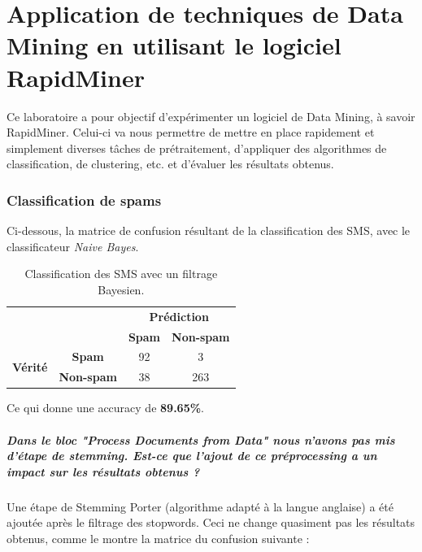 \documentclass[a4paper]{article}
\begin{document}
\part*{Application de techniques de Data Mining en utilisant le logiciel RapidMiner}
Ce laboratoire a pour objectif d'expérimenter un logiciel de Data Mining, à savoir RapidMiner.
Celui-ci va nous permettre de mettre en place rapidement et simplement diverses tâches de prétraitement, d'appliquer des algorithmes de classification, de clustering, etc. et d'évaluer les résultats obtenus.

\section{Classification de spams}
Ci-dessous, la matrice de confusion résultant de la classification des SMS, avec le classificateur \textit{Naive Bayes}.

\begin{table}[H]
	\centering
	\def\arraystretch{2.0}
	\begin{tabular}{cccl}
		                                                      & \textbf{}                              & \multicolumn{2}{c}{\textbf{Prédiction}}                                          \\ \cline{3-4} 
		    												  & \multicolumn{1}{c|}{}                  & \multicolumn{1}{c|}{\textbf{Spam}}      & \multicolumn{1}{c|}{\textbf{Non-spam}} \\ \cline{2-4} 
		\multicolumn{1}{c|}{\multirow{2}{*}{\textbf{Vérité}}} & \multicolumn{1}{c|}{\textbf{Spam}}     & \multicolumn{1}{c|}{92}                 & \multicolumn{1}{c|}{3}                 \\ \cline{2-4} 
		\multicolumn{1}{c|}{}                                 & \multicolumn{1}{c|}{\textbf{Non-spam}} & \multicolumn{1}{c|}{38}                 & \multicolumn{1}{c|}{263}               \\ \cline{2-4} 
	\end{tabular}
	\caption{Classification des SMS avec un filtrage Bayesien.}
\end{table}

Ce qui donne une accuracy de \textbf{89.65\%}.

\subsubsection*{Dans le bloc "Process Documents from Data" nous n'avons pas mis d'étape de stemming. Est-ce que l'ajout de ce préprocessing a un impact sur les résultats obtenus ?}
Une étape de Stemming Porter (algorithme adapté à la langue anglaise) a été ajoutée après le filtrage des stopwords.
Ceci ne change quasiment pas les résultats obtenus, comme le montre la matrice du confusion suivante :
\end{document}

